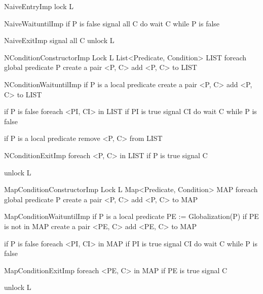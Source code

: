 \documentclass[preprint]{sigplanconf}
\begin{document}
\begin{SaveVerbatim}{NaiveEntryImp}
lock L 
\end{SaveVerbatim}

\begin{SaveVerbatim}{NaiveWaituntilImp}
if P is false
  signal all C
  do 
    wait C
  while P is false
\end{SaveVerbatim}

\begin{SaveVerbatim}{NaiveExitImp}
signal all C
unlock L
\end{SaveVerbatim}

\begin{SaveVerbatim}{NConditionConstructorImp}
Lock L
List<Predicate, Condition> LIST
foreach global predicate P
  create a pair <P, C>
  add <P, C> to LIST
\end{SaveVerbatim}

\begin{SaveVerbatim}{NConditionWaituntilImp}
if P is a local predicate 
  create a pair <P, C>
  add <P, C> to LIST
 
if P is false 
  foreach <PI, CI> in LIST
    if PI is true
      signal CI
  do 
    wait C
  while P is false

if P is a local predicate 
  remove <P, C> from LIST
\end{SaveVerbatim}

\begin{SaveVerbatim}{NConditionExitImp}
foreach <P, C> in LIST
  if P is true
    signal C

unlock L
\end{SaveVerbatim}


\begin{SaveVerbatim}{MapConditionConstructorImp}
Lock L
Map<Predicate, Condition> MAP
foreach global predicate P
  create a pair <P, C>
  add <P, C> to MAP 
\end{SaveVerbatim}

\begin{SaveVerbatim}{MapConditionWaituntilImp}
if P is a local predicate 
  PE := Globalization(P)
  if PE is not in MAP
    create a pair <PE, C>
    add <PE, C> to MAP
 
if P is false 
  foreach <PI, CI> in MAP
    if PI is true
      signal CI
  do 
    wait C
  while P is false
\end{SaveVerbatim}

\begin{SaveVerbatim}{MapConditionExitImp}
foreach <PE, C> in MAP
  if PE is true
    signal C

unlock L
\end{SaveVerbatim}
\end{document}
